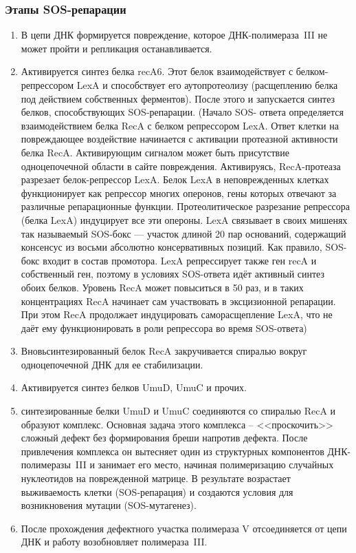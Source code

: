 \subsubsection{Этапы SOS-репарации}

\begin{enumerate}
	\item В цепи ДНК формируется повреждение, которое ДНК-полимераза~III не может пройти и репликация останавливается. 
	
	\item Активируется синтез белка recA6. Этот белок взаимодействует с белком-репрессором LexA и способствует его аутопротеолизу (расщеплению белка под действием собственных ферментов). После этого и запускается синтез белков, способствующих SOS-репарации. (Начало SOS- ответа определяется взаимодействием белка RecA с белком репрессором LexA. Ответ клетки на повреждающее воздействие начинается с активации протеазной активности белка RecA. Активирующим сигналом может быть присутствие одноцепочечной области в сайте повреждения. Активируясь, RecA-протеаза разрезает белок-репрессор LexA. Белок LexA в неповрежденных клетках функционирует как репрессор многих оперонов, гены которых отвечают за различные репарационные функции. Протеолитическое разрезание репрессора (белка LexA) индуцирует все эти опероны. LexA связывает в своих мишенях так называемый SOS-бокс — участок длиной 20 пар оснований, содержащий консенсус из восьми абсолютно консервативных позиций. Как правило, SOS-бокс входит в состав промотора. LexA репрессирует также ген recA и собственный ген, поэтому в условиях SOS-ответа идёт активный синтез обоих белков. Уровень RecA может повыситься в 50 раз, и в таких концентрациях RecA начинает сам участвовать в эксцизионной репарации. При этом RecA продолжает индуцировать саморасщепление LexA, что не даёт ему функционировать в роли репрессора во время SOS-ответа)
	
	\item Вновьсинтезированный белок RecA закручивается спиралью вокруг одноцепочечной ДНК для ее стабилизации.
	
	\item Активируется синтез белков UmuD, UmuC и прочих.
	
	\item синтезированные белки UmuD и UmuC соединяются со спиралью RecA и образуют комплекс. Основная задача этого комплекса – <<проскочить>> сложный дефект без формирования бреши напротив дефекта. После привлечения комплекса он вытесняет один из структурных компонентов ДНК-полимеразы~III и занимает его место, начиная полимеризацию случайных нуклеотидов на поврежденной матрице. В результате возрастает выживаемость клетки (SOS-репарация) и создаются условия для возникновения мутации (SOS-мутагенез).
	
	\item После прохождения дефектного участка полимераза V отсоединяется от цепи ДНК и работу возобновляет полимераза~III.
\end{enumerate}

